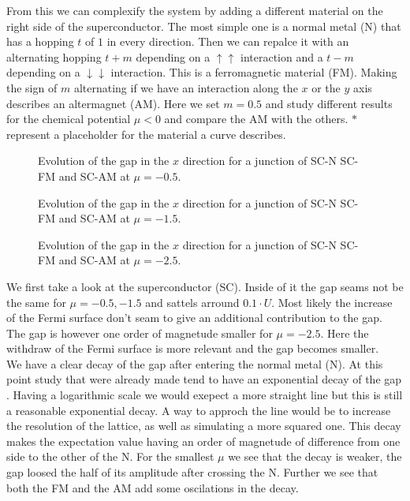\documentclass[..\main.tex]{subfile}
\begin{document}
From this we can complexify the system by adding a different material on the right side of the superconductor. 
The most simple one is a normal metal (N) that has a hopping $t$ of $1$ in every direction.
Then we can repalce it with an alternating hopping $t+m$ depending on a $\uparrow\uparrow$ interaction
and a $t-m$ depending on a $\downarrow\downarrow$ interaction. This is a ferromagnetic material (FM).
Making the sign of $m$ alternating if we have an interaction along the $x$ or the $y$ axis describes an altermagnet (AM).
Here we set $m=0.5$ and study different results for the chemical potential $\mu<0$ and compare the AM
with the others. $\ast$ represent a placeholder for the material a curve describes.\\
\begin{figure}[H]
  \centering
  
  \caption{Evolution of the gap in the $x$ direction for a junction of SC-N SC-FM and SC-AM at $\mu=-0.5$.}
\end{figure}\begin{figure}[H]
  \centering
  
  \caption{Evolution of the gap in the $x$ direction for a junction of SC-N SC-FM and SC-AM at $\mu=-1.5$.}
\end{figure}
\begin{figure}[H]
  \centering
  
  \caption{Evolution of the gap in the $x$ direction for a junction of SC-N SC-FM and SC-AM at $\mu=-2.5$.}
\end{figure}
We first take a look at the superconductor (SC). Inside of it the gap seams not be the same for $\mu=-0.5,-1.5$
and sattels arround $0.1\cdot U$. Most likely the increase of the Fermi surface don't seam to give an additional contribution to the gap.
The gap is however one order of magnetude smaller for $\mu=-2.5$. Here the withdraw of the Fermi surface is more relevant and the 
gap becomes smaller.\\
We have a clear decay of the gap after entering the normal metal (N). At this point 
study that were already made tend to have an exponential decay of the gap \cite{Mjos2019}. Having a logarithmic scale we would
exepect a more straight line but this is still a reasonable exponential decay. A way to approch the line would be to increase the 
resolution of the lattice, as well as simulating a more squared one. This decay makes the expectation value having an order of 
magnetude of difference from one side to the other of the N. For the smallest $\mu$ we see that the decay is weaker, the gap loosed
the half of its amplitude after crossing the N. Further we see that both the FM and the AM add some oscilations in the decay. \\
\end{document}
